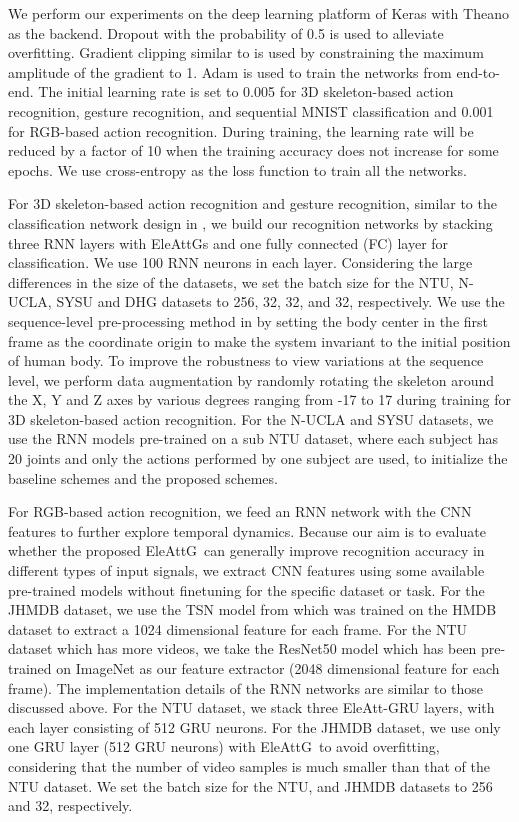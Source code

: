 \documentclass[journal]{IEEEtran}
\newcommand{\EleAttGn}{{EleAttG}}
\newcommand{\EleAttG}{{EleAttG~}}
\begin{document}
We perform our experiments on the deep learning platform of Keras \cite{chollet2015keras} with Theano \cite{al2016theano} as the backend. Dropout \cite{srivastava2014dropout} with the probability of 0.5 is used to alleviate overfitting. Gradient clipping similar to \cite{sutskever2014sequence} is used by constraining the maximum amplitude of the gradient to 1. Adam \cite{kingma2014adam} is used to train the networks from end-to-end. The initial learning rate is set to 0.005 for 3D skeleton-based action recognition, gesture recognition, and sequential MNIST classification and 0.001 for RGB-based action recognition. During training, the learning rate will be reduced by a factor of 10 when the training accuracy does not increase for some epochs. We use cross-entropy as the loss function to train all the networks. 

For 3D skeleton-based action recognition and gesture recognition, similar to the classification network design in \cite{zhang2017view}, we build our recognition networks by stacking three RNN layers with {\EleAttGn}s and one fully connected (FC) layer for classification. We use 100 RNN neurons in each layer. Considering the large differences in the size of the datasets, we set the batch size for the NTU, N-UCLA, SYSU and DHG datasets to 256, 32, 32, and 32, respectively. We use the sequence-level pre-processing method in \cite{zhang2017view} by setting the body center in the first frame as the coordinate origin to make the system invariant to the initial position of human body. To improve the robustness to view variations at the sequence level, we perform data augmentation by randomly rotating the skeleton around the X, Y and Z axes by various degrees ranging from -17 to 17 during training for 3D skeleton-based action recognition. For the N-UCLA and SYSU datasets, we use the RNN models pre-trained on a sub NTU dataset, where each subject has 20 joints and only the actions performed by one subject are used, to initialize the baseline schemes and the proposed schemes.   

For RGB-based action recognition, we feed an RNN network with the CNN features to further explore temporal dynamics. Because our aim is to evaluate whether the proposed \EleAttG can generally improve recognition accuracy in different types of input signals, we extract CNN features using some available pre-trained models without finetuning for the specific dataset or task. For the JHMDB dataset, we use the TSN model from \cite{wang2016temporal,TSNModel} which was trained on the HMDB dataset \cite{kuehne2011hmdb} to extract a 1024 dimensional feature for each frame. For the NTU dataset which has more videos, we take the ResNet50 model \cite{he2016deep,ResNet50Model} which has been pre-trained on ImageNet as our feature extractor (2048 dimensional feature for each frame). The implementation details of the RNN networks are similar to those discussed above. For the NTU dataset, we stack three EleAtt-GRU layers, with each layer consisting of 512 GRU neurons. For the JHMDB dataset, we use only one GRU layer (512 GRU neurons) with \EleAttG to avoid overfitting, considering that the number of video samples is much smaller than that of the NTU dataset. We set the batch size for the NTU, and JHMDB datasets to 256 and 32, respectively.
\end{document}
